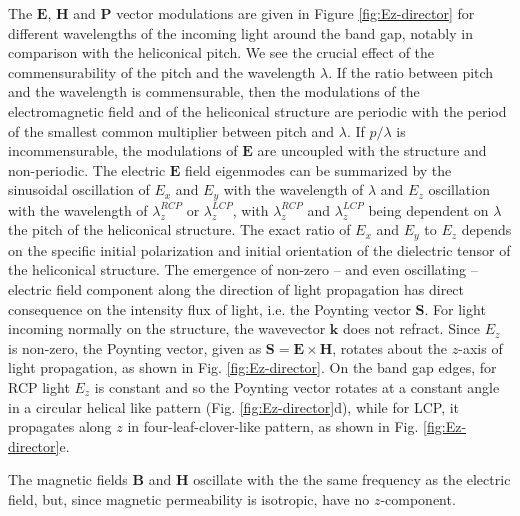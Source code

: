 \documentclass{osa-article}
\renewcommand{\vec}[1]{\mathbf{#1}}
\begin{document}
The $\vec{E}$, $\vec{H}$ and $\vec{P}$ vector modulations are given in Figure \ref{fig:Ez-director} for different wavelengths of the incoming light around the band gap,
notably in comparison with the heliconical pitch. 
We see the crucial effect of the commensurability of the pitch and the wavelength $\lambda$. 
If the ratio between pitch and the wavelength is commensurable, then the modulations of the electromagnetic field and of the heliconical structure are periodic
with the period of the smallest common multiplier between pitch and $\lambda$. 
If $p/\lambda$ is incommensurable, the modulations of $\vec{E}$ are uncoupled with the structure and non-periodic. 
The electric $\vec{E}$ field eigenmodes can be summarized by the sinusoidal oscillation of $E_x$ and $E_y$ with the wavelength of $\lambda$ 
and $E_z$ oscillation with the wavelength of $\lambda_z^{RCP}$ or $\lambda_z^{LCP}$, 
with $\lambda_z^{RCP}$ and $\lambda_z^{LCP}$ being dependent on $\lambda$ the pitch of the heliconical structure. 
The exact ratio of $E_x$ and $E_y$ to $E_z$ depends on the specific initial polarization and initial orientation of the dielectric tensor of the heliconical structure. 
The emergence of non-zero -- and even oscillating -- electric field component along the direction of light propagation
has direct consequence on the intensity flux of light, i.e. the Poynting vector $\vec{S}$.
For light incoming normally on the structure, the wavevector $\vec{k}$ does not refract. 
Since $E_z$ is non-zero, the Poynting vector, given as $\vec{S} = \vec{E} \times \vec{H}$, rotates about the $z$-axis of light propagation, as shown in Fig. \ref{fig:Ez-director}.
On the band gap edges, for RCP light $E_z$ is constant and so the Poynting vector rotates at a constant angle in a circular helical like pattern (Fig. \ref{fig:Ez-director}d),
while for LCP, it propagates along $z$ in four-leaf-clover-like pattern, as shown in Fig. \ref{fig:Ez-director}e. 


The magnetic fields $\vec{B}$ and $\vec{H}$ oscillate with the the same frequency as the electric field, 
but, since magnetic permeability is isotropic, have no $z$-component. 
\end{document}
